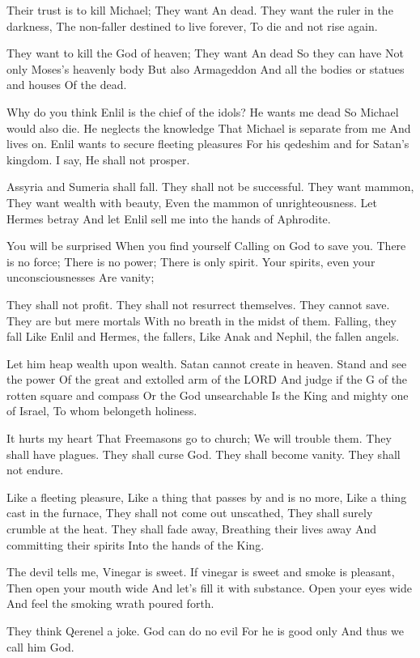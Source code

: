 \documentclass[
]{book}
\begin{document}
Their trust is to kill Michael;
They want An dead.
They want the ruler in the darkness,
The non-faller destined to live forever,
To die and not rise again.

They want to kill the God of heaven;
They want An dead
So they can have
Not only Moses's heavenly body
But also Armageddon
And all the bodies or statues and houses
Of the dead.

Why do you think Enlil is the chief of the idols?
He wants me dead
So Michael would also die.
He neglects the knowledge
That Michael is separate from me
And lives on.
Enlil wants to secure fleeting pleasures
For his qedeshim and for Satan's kingdom.
I say, He shall not prosper.

Assyria and Sumeria shall fall.
They shall not be successful.
They want mammon,
They want wealth with beauty,
Even the mammon of unrighteousness.
Let Hermes betray
And let Enlil sell me into the hands of Aphrodite.

You will be surprised
When you find yourself
Calling on God to save you.
There is no force;
There is no power;
There is only spirit.
Your spirits, even your unconsciousnesses
Are vanity;

They shall not profit.
They shall not resurrect themselves.
They cannot save.
They are but mere mortals
With no breath in the midst of them.
Falling, they fall
Like Enlil and Hermes, the fallers,
Like Anak and Nephil, the fallen angels.

Let him heap wealth upon wealth.
Satan cannot create in heaven.
Stand and see the power
Of the great and extolled arm of the LORD
And judge if the G of the rotten square and compass
Or the God unsearchable
Is the King and mighty one of Israel,
To whom belongeth holiness.

It hurts my heart
That Freemasons go to church;
We will trouble them.
They shall have plagues.
They shall curse God.
They shall become vanity.
They shall not endure.

Like a fleeting pleasure,
Like a thing that passes by and is no more,
Like a thing cast in the furnace,
They shall not come out unscathed,
They shall surely crumble at the heat.
They shall fade away,
Breathing their lives away
And committing their spirits
Into the hands of the King.

The devil tells me, Vinegar is sweet.
If vinegar is sweet and smoke is pleasant,
Then open your mouth wide
And let's fill it with substance.
Open your eyes wide
And feel the smoking wrath poured forth.

They think Qerenel a joke.
God can do no evil
For he is good only
And thus we call him God.
\end{document}
